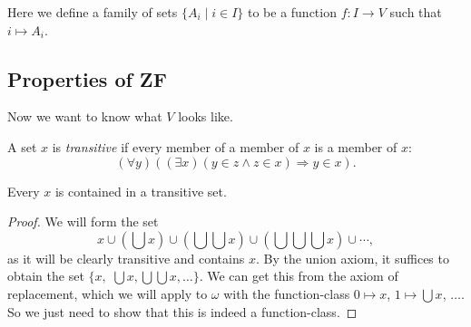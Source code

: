 \documentclass[a3paper, 10pt]{article}
\renewcommand{\vocab}[1]{\emph{#1}}
\begin{document}
\begin{multicols*}{5}
Here we define a family of sets $\{A_i \mid i \in I\}$ to be a function $f: I \rightarrow V$ such that $i \mapsto A_i$.

\subsection{Properties of ZF}
Now we want to know what $V$ looks like.

\begin{definition}
  A set $x$ is \vocab{transitive} if every member of a member of $x$ is a member of $x$:
  $$
  (\forall y)((\exists x)(y \in z \land z \in x) \Rightarrow y \in x).
  $$
\end{definition}

\begin{lemma}
  Every $x$ is contained in a transitive set.
\end{lemma}
\begin{proof}
  We will form the set
  $$
  x \cup \left(\bigcup x\right)\cup \left(\bigcup \bigcup x\right)\cup \left(\bigcup\bigcup\bigcup x\right)\cup \cdots,
  $$
  as it will be clearly transitive and contains $x$. By the union axiom, it suffices to obtain the set $\{x,$ $\bigcup x, \bigcup \bigcup x, \dots\}$. We can get this from the axiom of replacement, which we will apply to $\omega$ with the function-class $0 \mapsto x$, $1 \mapsto \bigcup x$, $\dots$. So we just need to show that this is indeed a function-class.


\end{proof}
\end{multicols*}
\end{document}
